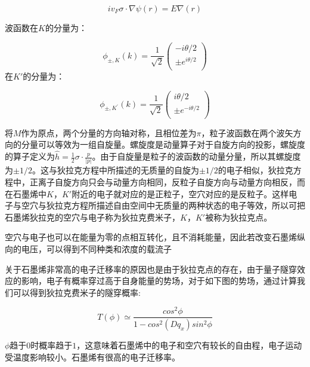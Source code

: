 \begin{equation}
  iv_{F}\sigma \cdot \nabla \psi(r)=E \nabla (r)
\end{equation}

波函数在$K$的分量为：

\begin{equation}
  \phi_{\pm,K}(k) = \dfrac 1 {\sqrt {2}} \left(\begin{array}{c}
      -i\theta/2         \\
      \pm e^{i\theta /2} \\
    \end{array}\right)
\end{equation}
在$K'$的分量为：

\begin{equation}
  \phi_{\pm,K^{\prime}}(k) = \dfrac 1 {\sqrt {2}} \left(\begin{array}{c}
      i\theta/2           \\
      \pm e^{-i\theta /2} \\
    \end{array}\right)
\end{equation}

将$M$作为原点，两个分量的方向轴对称，且相位差为$\pi$，粒子波函数在两个波矢方向的分量可以等效为一组自旋量。螺旋度是动量算子对于自旋方向的投影，螺旋度的算子定义为$\hat{h} =\frac{1}{2} \sigma \cdot \frac{p}{\left | p \right | }  $。由于自旋量是粒子的波函数的动量分量，所以其螺旋度为$\pm 1/2$。这与狄拉克方程中所描述的无质量的自旋为$\pm 1/2$的电子相似，狄拉克方程中，正离子自旋方向只会与动量方向相同，反粒子自旋方向与动量方向相反，而在石墨烯中$K$，$K'$附近的电子就对应的是正粒子，空穴对应的是反粒子。这样电子与空穴与狄拉克方程所描述自由空间中无质量的两种状态的电子等效，所以可把石墨烯狄拉克的空穴与电子称为狄拉克费米子，$K$，$K'$被称为狄拉克点。

空穴与电子也可以在能量为零的点相互转化，且不消耗能量，因此若改变石墨烯纵向的电压，可以得到不同种类和浓度的载流子

关于石墨烯非常高的电子迁移率的原因也是由于狄拉克点的存在，由于量子隧穿效应的影响，电子有概率穿过高于自身能量的势场，对于如下图的势场，通过计算我们可以得到狄拉克费米子的隧穿概率:

\begin{equation}\label{...}
  T(\phi )\simeq \frac{cos^{2}\phi }{1-cos^{2}(Dq_{x})sin^{2} \phi }
\end{equation}

$\phi$趋于$0$时概率趋于$1$，这意味着石墨烯中的电子和空穴有较长的自由程，电子运动受温度影响较小。石墨烯有很高的电子迁移率。

